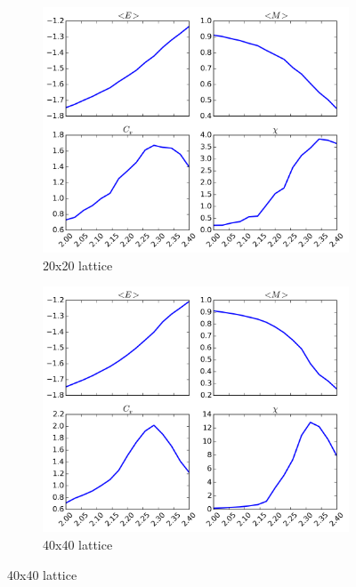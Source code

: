 \documentclass[11pt,a4paper,final]{article}
\numberwithin{equation}{section}
\begin{document}
\begin{figure}
\centering
\begin{subfigure}{0.49\textwidth}
\includegraphics[width=\textwidth]{pics/e20.png}
\caption{20x20 lattice}
\label{fig:e20}
\end{subfigure}
%
\begin{subfigure}{0.49\textwidth}
\centering
\includegraphics[width=\textwidth]{pics/e40.png}
\caption{40x40 lattice}
\label{fig:e40}
\end{subfigure}


\end{figure}
\end{document}
